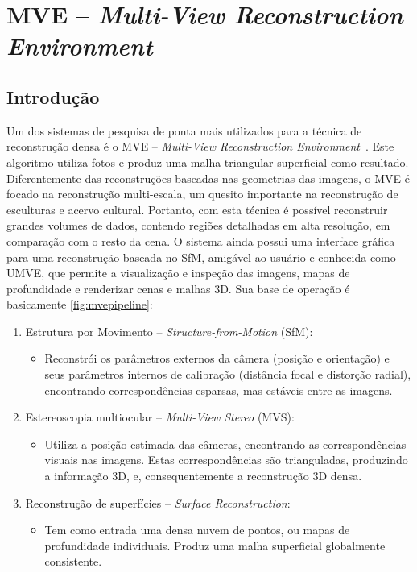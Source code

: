 \doublespacing
\section{MVE -- \emph{Multi-View Reconstruction Environment}}\label{sec:mve}
%

\doublespacing

\subsection{Introdução}
Um dos sistemas de pesquisa de ponta mais utilizados para a técnica de reconstrução densa é o MVE --
\emph{Multi-View Reconstruction Environment}~\cite{mve}. Este algoritmo utiliza
fotos e produz uma malha triangular superficial como resultado. Diferentemente
das reconstruções baseadas nas geometrias das imagens, o MVE é focado na
reconstrução multi-escala, um quesito importante na reconstrução de esculturas e
acervo cultural. Portanto, com esta técnica é possível reconstruir grandes
volumes de dados, contendo regiões detalhadas em alta resolução, em comparação
com o resto da cena. O sistema ainda possui uma interface gráfica para uma
reconstrução baseada no SfM, amigável ao usuário e conhecida como UMVE, que
permite a visualização e inspeção das imagens, mapas de profundidade e
renderizar cenas e malhas 3D. Sua base de operação é basicamente
\ref{fig:mvepipeline}:
\begin{enumerate}
\item{Estrutura por Movimento -- \emph{Structure-from-Motion} (SfM):}

\begin{itemize}
\item{
Reconstrói os parâmetros externos da câmera (posição e orientação) e seus
parâmetros internos de calibração (distância focal e distorção radial), encontrando correspondências
esparsas, mas estáveis entre as imagens.
}
\end{itemize}

\item{Estereoscopia multiocular -- \emph{Multi-View Stereo} (MVS):}
\begin{itemize}
\item{
Utiliza a posição estimada das câmeras, encontrando as correspondências visuais
nas imagens. Estas correspondências são trianguladas, produzindo a informação
3D, e, consequentemente a reconstrução 3D densa.
} 
\end{itemize}
\item{Reconstrução de superfícies -- \emph{Surface Reconstruction}:}
\begin{itemize}
\item{
Tem como entrada uma densa nuvem de pontos, ou mapas de profundidade
individuais. Produz uma malha superficial globalmente consistente.
}
\end{itemize}
\end{enumerate}

